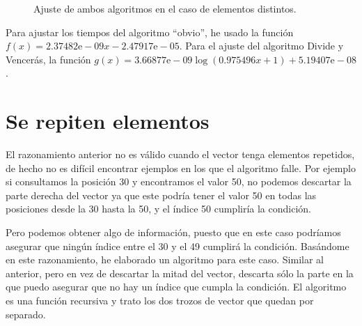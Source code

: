 \documentclass[a4]{article}
\begin{document}
\begin{figure}[H]
  \centering
  \caption{Ajuste de ambos algoritmos en el caso de elementos distintos.}
  \label{fig:ajust-distintos}
\end{figure}

Para ajustar los tiempos del algoritmo ``obvio'', he usado la función
\\ $f(x)=2.37482\mbox{e}-09x-2.47917\mbox{e}-05$. Para el ajuste del
algoritmo Divide y Vencerás, la función
$g(x)=3.66877\mbox{e}-09\log(0.975496x+1)+5.19407\mbox{e}-08$.

\section{Se repiten elementos}
El razonamiento anterior no es válido cuando el vector tenga elementos
repetidos, de hecho no es difícil encontrar ejemplos en los que el
algoritmo falle. Por ejemplo si consultamos la posición 30 y
encontramos el valor 50, no podemos descartar la parte derecha del
vector ya que este podría tener el valor 50 en todas las posiciones
desde la 30 hasta la 50, y el índice 50 cumpliría la condición.

Pero podemos obtener algo de información, puesto que en este caso
podríamos asegurar que ningún índice entre el 30 y el 49 cumplirá la
condición. Basándome en este razonamiento, he elaborado un algoritmo
para este caso. Similar al anterior, pero en vez de descartar la mitad
del vector, descarta sólo la parte en la que puedo asegurar que no hay
un índice que cumpla la condición. El algoritmo es una función
recursiva y trato los dos trozos de vector que quedan por separado.
\end{document}
